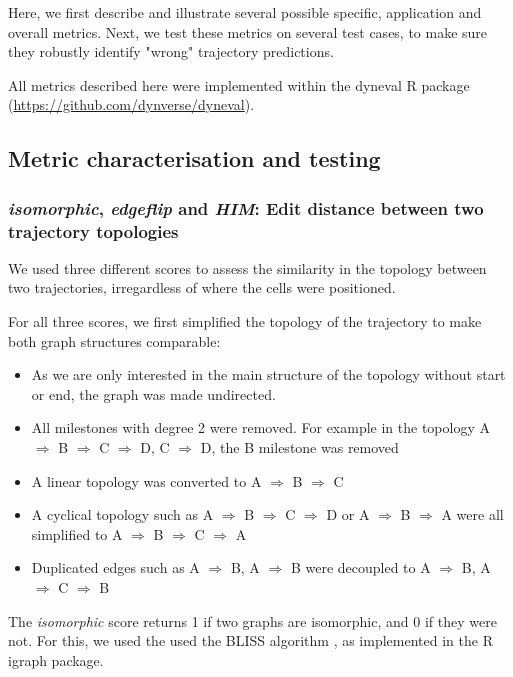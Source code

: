 Here, we first describe and illustrate several possible specific, application and overall metrics. Next, we test these metrics on several test cases, to make sure they robustly identify "wrong" trajectory predictions.

All metrics described here were implemented within the dyneval R package (\url{https://github.com/dynverse/dyneval}).

\subsection{Metric characterisation and testing}

\subsubsection{\textit{isomorphic}, \textit{edgeflip} and \textit{HIM}: Edit distance between two trajectory topologies}

We used three different scores to assess the similarity in the topology between two trajectories, irregardless of where the cells were positioned.

For all three scores, we first simplified the topology of the trajectory to make both graph structures comparable:

\begin{itemize}
	\item As we are only interested in the main structure of the topology without start or end, the graph was made undirected.
	\item All milestones with degree 2 were removed. For example in the topology A $\Rightarrow$ B $\Rightarrow$ C $\Rightarrow$ D, C $\Rightarrow$ D, the B milestone was removed
	\item A linear topology was converted to A $\Rightarrow$ B $\Rightarrow$ C
	\item A cyclical topology such as A $\Rightarrow$ B $\Rightarrow$ C $\Rightarrow$ D or A $\Rightarrow$ B $\Rightarrow$ A were all simplified to A $\Rightarrow$ B $\Rightarrow$ C $\Rightarrow$ A
	\item Duplicated edges such as A $\Rightarrow$ B, A $\Rightarrow$ B were decoupled to A $\Rightarrow$ B, A $\Rightarrow$ C $\Rightarrow$ B
\end{itemize}

The \textit{isomorphic} score returns 1 if two graphs are isomorphic, and 0 if they were not. For this, we used the used the BLISS algorithm \cite{junttila_engineeringefficientcanonical_2007}, as implemented in the R igraph package.

